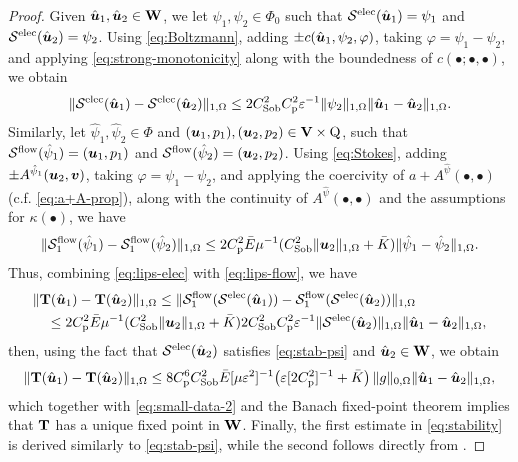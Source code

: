 \begin{proof}
Given $\hat{\boldsymbol{u}}_1,  \hat{\boldsymbol{u}}_2 \in \mathbf{W}$, we let $\psi_1, \psi_2 \in \Phi_0$ such that $\mathcal{S}^{\mathrm{elec}}(\hat{\boldsymbol{u}}_1) = \psi_1$ and $\mathcal{S}^{\mathrm{elec}}(\hat{\boldsymbol{u}}_2) = \psi_2$. Using \eqref{eq:Boltzmann}, adding  $\pm c(\hat{\boldsymbol{u}}_1, \psi_2, \varphi)$, taking $\varphi = \psi_1 - \psi_2$, and applying  \eqref{eq:strong-monotonicity} along with the boundedness of $c(\bullet;\bullet,\bullet)$, we obtain
\begin{equation}\label{eq:lips-elec}
\|\mathcal{S}^{\mathrm{elec}}(\hat{\boldsymbol{u}}_1) - \mathcal{S}^{\mathrm{elec}}(\hat{\boldsymbol{u}}_2)\|_{1,\Omega}\leq 2C_{\mathrm{Sob}}^2C_{\mathrm{p}}^2\varepsilon^{-1}\|\psi_2\|_{1,\Omega} \|\hat{\boldsymbol{u}}_1 - \hat{\boldsymbol{u}}_2\|_{1,\Omega}.
\end{equation}
Similarly, let $\hat\psi_1, \hat\psi_2 \in \Phi$ and $(\boldsymbol{u}_1, p_1),  (\boldsymbol{u}_2, p_2) \in \mathbf{V} \times \mathrm{Q}$, such that $\mathcal{S}^{\mathrm{flow}}(\hat{\psi}_1) = (\boldsymbol{u}_1, p_1)$ and $\mathcal{S}^{\mathrm{flow}}(\hat{\psi}_2) = (\boldsymbol{u}_2, p_2)$. Using \eqref{eq:Stokes}, adding $\pm A^{\hat{\psi}_1}(\boldsymbol{u}_2, \boldsymbol{v})$, taking $\varphi = \psi_1 - \psi_2$, and applying the coercivity of $a + A^{\hat{\psi}}(\bullet,\bullet)$
(c.f. \eqref{eq:a+A-prop}), along with the continuity of $A^{\hat{\psi}}(\bullet,\bullet)$ and the assumptions for $\kappa(\bullet)$, we have
\begin{equation}\label{eq:lips-flow}
\|\mathcal{S}^{\mathrm{flow}}_1(\hat\psi_1) - \mathcal{S}^{\mathrm{flow}}_1(\hat\psi_2)\|_{1,\Omega} \leq 2 C_{\mathrm{p}}^2 \bar{E}\mu^{-1} (C_{\mathrm{Sob}}^2 \|\boldsymbol{u}_2\|_{1,\Omega} + \bar{K}) \|\hat\psi_1 - \hat\psi_2\|_{1,\Omega}.
\end{equation}
Thus, combining \eqref{eq:lips-elec} with \eqref{eq:lips-flow}, we have
\begin{align*}
&\|\mathbf{T}(\hat{\boldsymbol{u}}_1) - \mathbf{T}(\hat{\boldsymbol{u}}_2)\|_{1,\Omega} \leq  \|\mathcal{S}^{\mathrm{flow}}_1(\mathcal{S}^{\mathrm{elec}}(\hat{\boldsymbol{u}}_1)) - \mathcal{S}^{\mathrm{flow}}_1(\mathcal{S}^{\mathrm{elec}}(\hat{\boldsymbol{u}}_2))\|_{1,\Omega}\\
&\quad \leq  2 C_{\mathrm{p}}^2 \bar{E}\mu^{-1} (C_{\mathrm{Sob}}^2 \|\boldsymbol{u}_2\|_{1,\Omega} + \bar{K}) 2C_{\mathrm{Sob}}^2C_{\mathrm{p}}^2 \varepsilon^{-1} \|\mathcal{S}^{\mathrm{elec}}(\hat{\boldsymbol{u}}_2)\|_{1,\Omega} \|\hat{\boldsymbol{u}}_1 - \hat{\boldsymbol{u}}_2\|_{1,\Omega},
\end{align*}
then, using the fact that $\mathcal{S}^{\mathrm{elec}}(\hat{\boldsymbol{u}}_2)$ satisfies \eqref{eq:stab-psi} and $\hat{\boldsymbol{u}}_2\in \mathbf{W}$, we obtain
\begin{equation*}
\|\mathbf{T}(\hat{\boldsymbol{u}}_1) - \mathbf{T}(\hat{\boldsymbol{u}}_2)\|_{1,\Omega}  \leq  {8 C_{\mathrm{p}}^6 C_{\mathrm{Sob}}^2 \bar{E}}[{\mu \varepsilon^2}]^{-1} \bigl({\varepsilon}[{2 C_{\mathrm{p}}^2}]^{-1} + \bar{K} \bigr) \,\|g\|_{0,\Omega} \|\hat{\boldsymbol{u}}_1 - \hat{\boldsymbol{u}}_2\|_{1,\Omega},
\end{equation*}
which together with \eqref{eq:small-data-2} and the Banach fixed-point theorem implies that $\mathbf{T}$ has a unique fixed point in $\mathbf{W}$.  %
Finally, the first estimate in \eqref{eq:stability} is derived similarly to \eqref{eq:stab-psi}, while the second follows directly from \cite[Th.    2.34]{ern04}.
\end{proof}

